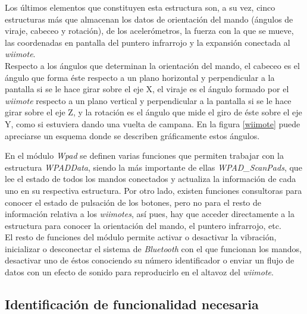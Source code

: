 
Los últimos elementos que constituyen esta estructura son, a su vez, cinco estructuras más que almacenan los datos de orientación del mando (ángulos de viraje, cabeceo y rotación), de los acelerómetros, la fuerza con la que se mueve, las coordenadas en pantalla del puntero infrarrojo y la expansión conectada al \emph{wiimote}.\\

Respecto a los ángulos que determinan la orientación del mando, el cabeceo es el ángulo que forma éste respecto a un plano horizontal y perpendicular a la pantalla si se le hace girar sobre el eje X, el viraje es el ángulo formado por el \emph{wiimote} respecto a un plano vertical y perpendicular a la pantalla si se le hace girar sobre el eje Z, y la rotación es el ángulo que mide el giro de éste sobre el eje Y, como si estuviera dando una vuelta de campana. En la figura \ref{wiimote} puede apreciarse un esquema donde se describen gráficamente estos ángulos.\\


En el módulo \emph{Wpad} se definen varias funciones que permiten trabajar con la estructura \emph{WPADData}, siendo la más importante de ellas \emph{WPAD\_ScanPads}, que lee el estado de todos los mandos conectados y actualiza la información de cada uno en su respectiva estructura. Por otro lado, existen funciones consultoras para conocer el estado de pulsación de los botones, pero no para el resto de información relativa a los \emph{wiimotes}, así pues, hay que acceder directamente a la estructura para conocer la orientación del mando, el puntero infrarrojo, etc.\\

El resto de funciones del módulo permite activar o desactivar la vibración, inicializar o desconectar el sistema de \emph{Bluetooth} con el que funcionan los mandos, desactivar uno de éstos conociendo su número identificador o enviar un flujo de datos con un efecto de sonido para reproducirlo en el altavoz del \emph{wiimote}.

\subsection{Identificación de funcionalidad necesaria}

